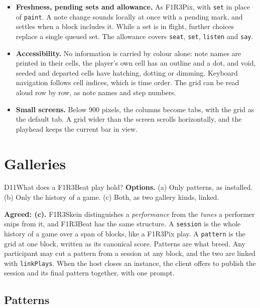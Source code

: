 \documentclass[11pt,a4paper]{article}
\newcommand{\code}[1]{\texttt{#1}}
\begin{document}
\begin{itemize}[leftmargin=1.2em,itemsep=2pt]
\item \textbf{Freshness, pending sets and allowance.} As F1R3Pix, with \code{set} in place of
  \code{paint}. A note change sounds locally at once with a pending mark, and settles when a
  block includes it. While a set is in flight, further choices replace a single queued set.
  The allowance covers \code{seat}, \code{set}, \code{listen} and \code{say}.
\item \textbf{Accessibility.} No information is carried by colour alone: note names are
  printed in their cells, the player's own cell has an outline and a dot, and void, seeded
  and departed cells have hatching, dotting or dimming. Keyboard navigation follows cell
  indices, which is time order. The grid can be read aloud row by row, as note names and step
  numbers.
\item \textbf{Small screens.} Below 900 pixels, the columns become tabs, with the grid as the
  default tab. A grid wider than the screen scrolls horizontally, and the playhead keeps the
  current bar in view.
\end{itemize}

\section{Galleries}\label{sec:gallery}

\begin{decision}{D11}{What does a F1R3Beat play hold?}
\textbf{Options.} (a) Only patterns, as installed. (b) Only the history of a game. (c) Both,
as two gallery kinds, linked.

\textbf{Agreed: (c).} F1R3Skein distinguishes a \emph{performance} from the
\emph{tunes} a performer snips from it, and F1R3Beat has the same structure. A \code{session}
is the whole history of a game over a span of blocks, like a F1R3Pix play. A \code{pattern} is
the grid at one block, written as its canonical score. Patterns are what breed. Any participant
may cut a pattern from a session at any block, and the two are linked with \code{linkPlays}.
When the host closes an instance, the client offers to publish the session and its final
pattern together, with one prompt.
\end{decision}

\subsection{Patterns}
\end{document}
